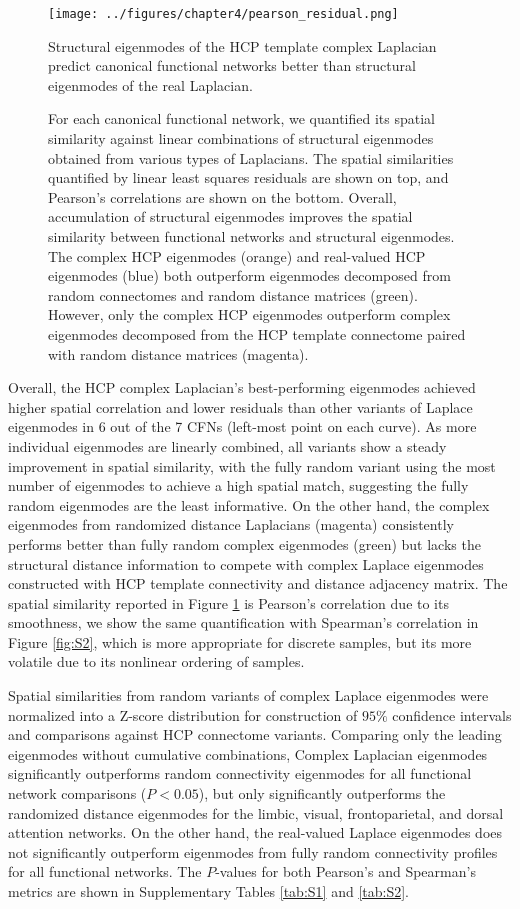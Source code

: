 \begin{figure}[htbp]
\centering
\texttt{[image: ../figures/chapter4/pearson\_residual.png]}
\caption{Structural eigenmodes of the HCP template complex Laplacian predict canonical functional networks better than structural eigenmodes of the real Laplacian.}
\caption*{For each canonical functional network, we quantified its spatial similarity against linear combinations of structural eigenmodes obtained from various types of Laplacians. The spatial similarities quantified by linear least squares residuals are shown on top, and Pearson's correlations are shown on the bottom. Overall, accumulation of structural eigenmodes improves the spatial similarity between functional networks and structural eigenmodes. The complex HCP eigenmodes (orange) and real-valued HCP eigenmodes (blue) both outperform eigenmodes decomposed from random connectomes and random distance matrices (green). However, only the complex HCP eigenmodes outperform complex eigenmodes decomposed from the HCP template connectome paired with random distance matrices (magenta).
}
\label{fig:fig6}
\end{figure}

Overall, the HCP complex Laplacian's best-performing eigenmodes achieved higher spatial correlation and lower residuals than other variants of Laplace eigenmodes in 6 out of the 7 CFNs (left-most point on each curve). As more individual eigenmodes are linearly combined, all variants show a steady improvement in spatial similarity, with the fully random variant using the most number of eigenmodes to achieve a high spatial match, suggesting the fully random eigenmodes are the least informative. On the other hand, the complex eigenmodes from randomized distance Laplacians (magenta) consistently performs better than fully random complex eigenmodes (green) but lacks the structural distance information to compete with complex Laplace eigenmodes constructed with HCP template connectivity and distance adjacency matrix. The spatial similarity reported in Figure \ref{fig:fig6} is Pearson's correlation due to its smoothness, we show the same quantification with Spearman's correlation in Figure \ref{fig:S2}, which is more appropriate for discrete samples, but its more volatile due to its nonlinear ordering of samples. 

Spatial similarities from random variants of complex Laplace eigenmodes were normalized into a Z-score distribution for construction of $95\%$ confidence intervals and comparisons against HCP connectome variants. Comparing only the leading eigenmodes without cumulative combinations, Complex Laplacian eigenmodes significantly outperforms random connectivity eigenmodes for all functional network comparisons ($P<0.05$), but only significantly outperforms the randomized distance eigenmodes for the limbic, visual, frontoparietal, and dorsal attention networks. On the other hand, the real-valued Laplace eigenmodes does not significantly outperform eigenmodes from fully random connectivity profiles for all functional networks. The $P$-values for both Pearson's and Spearman's metrics are shown in Supplementary Tables \ref{tab:S1} and \ref{tab:S2}.

